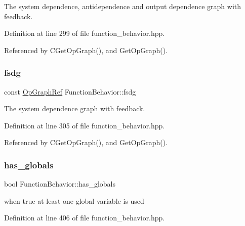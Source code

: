 The system dependence, antidependence and output dependence graph with feedback. 



Definition at line 299 of file function\+\_\+behavior.\+hpp.



Referenced by C\+Get\+Op\+Graph(), and Get\+Op\+Graph().

\mbox{\label{classFunctionBehavior_afab0ef4738fe6dbfd99dfb12ad648825}} 
\subsubsection{\texorpdfstring{fsdg}{fsdg}}
{\footnotesize\ttfamily const \hyperlink{op__graph_8hpp_aee97c95c40f791b60c451d9e29c72d39}{Op\+Graph\+Ref} Function\+Behavior\+::fsdg\hspace{0.3cm}{\ttfamily [private]}}



The system dependence graph with feedback. 



Definition at line 305 of file function\+\_\+behavior.\+hpp.



Referenced by C\+Get\+Op\+Graph(), and Get\+Op\+Graph().

\mbox{\label{classFunctionBehavior_a1dd60208e508751be9dc4d13c7afd1db}} 
\subsubsection{\texorpdfstring{has\+\_\+globals}{has\_globals}}
{\footnotesize\ttfamily bool Function\+Behavior\+::has\+\_\+globals\hspace{0.3cm}{\ttfamily [private]}}



when true at least one global variable is used 



Definition at line 406 of file function\+\_\+behavior.\+hpp.

\mbox{\label{classFunctionBehavior_aa3f83e3d41707b404a4cbad317061013}} 
